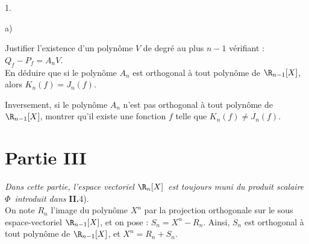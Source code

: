 \documentclass[11pt]{article}%
\begin{document}
\begin{noliste}{1.}
\begin{noliste}{a)}
 \setlength{\itemsep}{2mm}
\item Justifier l'existence d'un polynôme $V$ de degré au plus $n-1$
vérifiant : $Q_{f}-P_{f} = A_{n}V$.\\
En déduire que si le polynôme $A_{n}$ est orthogonal à tout polynôme de
$\R_{n-1}[X]$, alors $K_{n}(f) = J_{n}(f)$.

\item Inversement, si le polynôme $A_{n}$ n'est pas orthogonal à tout
polynôme de $\R_{n-1}[X]$, montrer qu'il existe une fonction $f$ telle
que 
$K_{n}(f)\not = J_{n}(f)$.
\end{noliste}
\end{noliste}

\section*{Partie III}

\textit{Dans cette partie, l'espace vectoriel }$\R_{n}[X]$\textit{\
est toujours muni du produit scalaire }$\Phi $\textit{\ introduit dans
}\textbf{II.}4)$.$\\
On note $R_{n}$ l'image du polynôme $X^{n}$ par la projection
orthogonale
sur le sous espace-vectoriel $\R_{n-1}[X]$, et on pose : $S_{n} =
X^{n}-R_{n}$. Ainsi, $S_{n}$ est orthogonal à tout polynôme de
$\R_{n-1}[X]$, et $X^{n} = R_{n} + S_{n}$.
\end{document}
